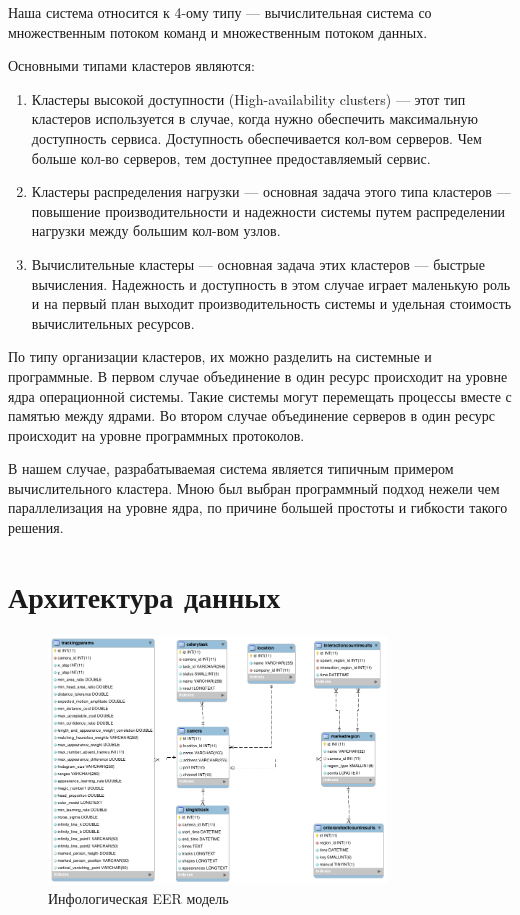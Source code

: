Наша система относится к 4-ому типу — вычислительная система со множественным потоком команд и множественным потоком данных.

Основными типами кластеров являются:
\begin{enumerate}
  \item Кластеры высокой доступности (High-availability clusters) — этот тип кластеров используется в случае, когда нужно обеспечить максимальную доступность сервиса. Доступность обеспечивается кол-вом серверов. Чем больше кол-во серверов, тем доступнее предоставляемый сервис.
  \item Кластеры распределения нагрузки — основная задача этого типа кластеров — повышение производительности и надежности системы путем распределении нагрузки между большим кол-вом узлов.
  \item Вычислительные кластеры — основная задача этих кластеров — быстрые вычисления. Надежность и доступность в этом случае играет маленькую роль и на первый план выходит производительность системы и удельная стоимость вычислительных ресурсов.
\end{enumerate}

По типу организации кластеров, их можно разделить на системные и программные. В первом случае объединение в один ресурс происходит на уровне ядра операционной системы. Такие системы могут перемещать процессы вместе с памятью между ядрами. Во втором случае объединение серверов в один ресурс происходит на уровне программных протоколов.

В нашем случае, разрабатываемая система является типичным примером вычислительного кластера. Мною был выбран программный подход нежели чем параллелизация на уровне ядра, по причине большей простоты и гибкости такого решения.






\section{Архитектура данных}


\begin{figure}[h]
  \centering
  \includegraphics[width=0.8\textwidth]{assets/schema-1.png}
  \caption{Инфологическая EER модель}
  \label{fig:fig01}
\end{figure}
